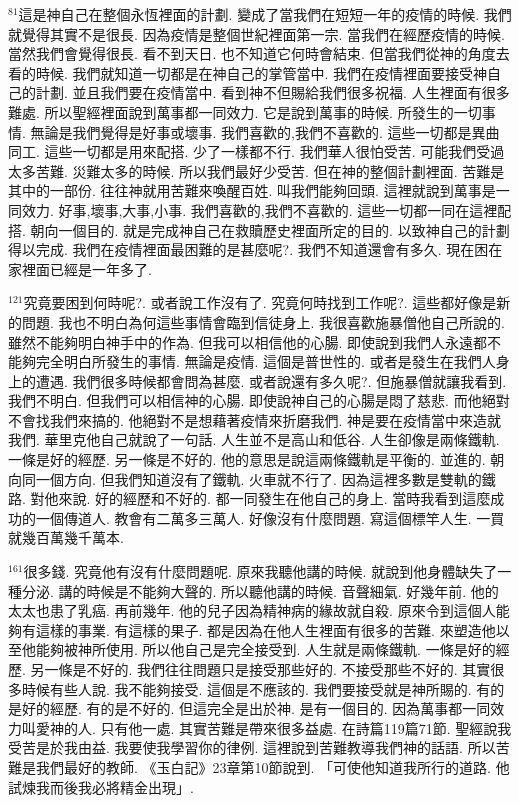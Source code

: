 \documentclass{book}
\begin{document}
$^{81}$這是神自己在整個永恆裡面的計劃.
變成了當我們在短短一年的疫情的時候.
我們就覺得其實不是很長.
因為疫情是整個世紀裡面第一宗.
當我們在經歷疫情的時候.
當然我們會覺得很長.
看不到天日.
也不知道它何時會結束.
但當我們從神的角度去看的時候.
我們就知道一切都是在神自己的掌管當中.
我們在疫情裡面要接受神自己的計劃.
並且我們要在疫情當中.
看到神不但賜給我們很多祝福.
人生裡面有很多難處.
所以聖經裡面說到萬事都一同效力.
它是說到萬事的時候.
所發生的一切事情.
無論是我們覺得是好事或壞事.
我們喜歡的,我們不喜歡的.
這些一切都是異曲同工.
這些一切都是用來配搭.
少了一樣都不行.
我們華人很怕受苦.
可能我們受過太多苦難.
災難太多的時候.
所以我們最好少受苦.
但在神的整個計劃裡面.
苦難是其中的一部份.
往往神就用苦難來喚醒百姓.
叫我們能夠回頭.
這裡就說到萬事是一同效力.
好事,壞事,大事,小事.
我們喜歡的,我們不喜歡的.
這些一切都一同在這裡配搭.
朝向一個目的.
就是完成神自己在救贖歷史裡面所定的目的.
以致神自己的計劃得以完成.
我們在疫情裡面最困難的是甚麼呢?.
我們不知道還會有多久.
現在困在家裡面已經是一年多了.

$^{121}$究竟要困到何時呢?.
或者說工作沒有了.
究竟何時找到工作呢?.
這些都好像是新的問題.
我也不明白為何這些事情會臨到信徒身上.
我很喜歡施暴僧他自己所說的.
雖然不能夠明白神手中的作為.
但我可以相信他的心腸.
即使說到我們人永遠都不能夠完全明白所發生的事情.
無論是疫情.
這個是普世性的.
或者是發生在我們人身上的遭遇.
我們很多時候都會問為甚麼.
或者說還有多久呢?.
但施暴僧就讓我看到.
我們不明白.
但我們可以相信神的心腸.
即使說神自己的心腸是悶了慈悲.
而他絕對不會找我們來搞的.
他絕對不是想藉著疫情來折磨我們.
神是要在疫情當中來造就我們.
華里克他自己就說了一句話.
人生並不是高山和低谷.
人生卻像是兩條鐵軌.
一條是好的經歷.
另一條是不好的.
他的意思是說這兩條鐵軌是平衡的.
並進的.
朝向同一個方向.
但我們知道沒有了鐵軌.
火車就不行了.
因為這裡多數是雙軌的鐵路.
對他來說.
好的經歷和不好的.
都一同發生在他自己的身上.
當時我看到這麼成功的一個傳道人.
教會有二萬多三萬人.
好像沒有什麼問題.
寫這個標竿人生.
一買就幾百萬幾千萬本.

$^{161}$很多錢.
究竟他有沒有什麼問題呢.
原來我聽他講的時候.
就說到他身體缺失了一種分泌.
講的時候是不能夠大聲的.
所以聽他講的時候.
音聲細氣.
好幾年前.
他的太太也患了乳癌.
再前幾年.
他的兒子因為精神病的緣故就自殺.
原來令到這個人能夠有這樣的事業.
有這樣的果子.
都是因為在他人生裡面有很多的苦難.
來塑造他以至他能夠被神所使用.
所以他自己是完全接受到.
人生就是兩條鐵軌.
一條是好的經歷.
另一條是不好的.
我們往往問題只是接受那些好的.
不接受那些不好的.
其實很多時候有些人說.
我不能夠接受.
這個是不應該的.
我們要接受就是神所賜的.
有的是好的經歷.
有的是不好的.
但這完全是出於神.
是有一個目的.
因為萬事都一同效力叫愛神的人.
只有他一處.
其實苦難是帶來很多益處.
在詩篇119篇71節.
聖經說我受苦是於我由益.
我要使我學習你的律例.
這裡說到苦難教導我們神的話語.
所以苦難是我們最好的教師.
《玉白記》23章第10節說到.
「可使他知道我所行的道路.
他試煉我而後我必將精金出現」.
\end{document}
